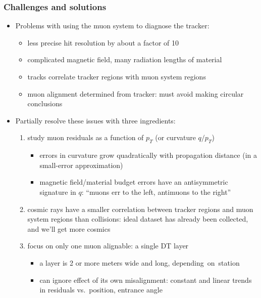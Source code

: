 \documentclass[compress]{beamer}
\begin{document}
\begin{frame}
\frametitle{Challenges and solutions}
\begin{itemize}
\item<1-> Problems with using the muon system to diagnose the tracker:
\begin{itemize}
\item less precise hit resolution by about a factor of 10
\item complicated magnetic field, many radiation lengths of material
\item tracks correlate tracker regions with muon system regions
\item muon alignment determined from tracker: must avoid making circular conclusions
\end{itemize}

\item<2-> Partially resolve these issues with three ingredients:
\begin{enumerate}
\item<2-> study muon residuals as a function of $p_T$ (or curvature $q/p_T$)
\begin{itemize}
\item errors in curvature grow quadratically with propagation distance (in a small-error approximation)
\item magnetic field/material budget errors have an antisymmetric signature in $q$: ``muons err to the left, antimuons to the right''
\end{itemize}

\item<3-> cosmic rays have a smaller correlation between tracker regions and muon system regions than collisions: ideal dataset has already been collected, and we'll get more cosmics

\item<4-> focus on only one muon alignable: a single DT layer
\begin{itemize}
\item a layer is 2 or more meters wide and long, \mbox{depending on station\hspace{-1 cm}}
\item can ignore effect of its own misalignment: constant and linear trends in residuals vs.~position, entrance angle
\end{itemize}
\end{enumerate}
\end{itemize}
\end{frame}
\end{document}

